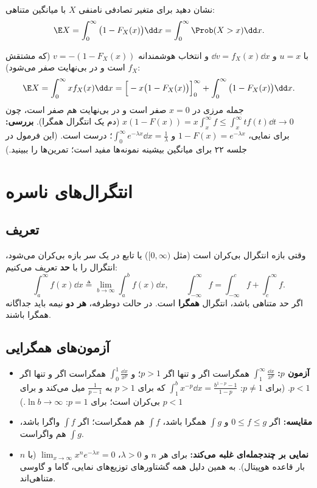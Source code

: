 \begin{example}
نشان دهید برای متغیر تصادفی نامنفی $X$ با میانگین متناهی:
\[
\E X=\int_0^\infty\big(1-F_X(x)\big)\dd x=\int_0^\infty\Prob(X>x)\dd x .
\]
\begin{solution}
با $u=x$ و $\dd v=f_X(x)\dd x$ و انتخاب هوشمندانه $v=-(1-F_X(x))$ (که مشتقش $f_X$ است و در بی‌نهایت صفر می‌شود):
\[
\E X=\int_0^\infty xf_X(x)\dd x=\Big[-x\big(1-F_X(x)\big)\Big]_0^\infty+\int_0^\infty\big(1-F_X(x)\big)\dd x .
\]
جمله مرزی در $x=0$ صفر است و در بی‌نهایت هم صفر است، چون $x(1-F(x))=x\int_x^\infty f\le\int_x^\infty tf(t)\dd t\to0$ (دم یک انتگرال همگرا). \textbf{بررسی:} برای نمایی، $1-F(x)=e^{-\lambda x}$ و $\int_0^\infty e^{-\lambda x}\dd x=\frac1\lambda$؛ درست است. (این فرمول در جلسه ۲۲ برای میانگین بیشینه نمونه‌ها مفید است؛ تمرین‌ها را ببینید.)
\end{solution}
\end{example}

\section{انتگرال‌های ناسره}

\subsection{تعریف}
وقتی بازه انتگرال بی‌کران است (مثل $[0,\infty)$) یا تابع در یک سر بازه بی‌کران می‌شود، انتگرال را با \textbf{حد} تعریف می‌کنیم:
\[
\int_a^\infty f(x)\dd x\triangleq\lim_{b\to\infty}\int_a^bf(x)\dd x,\qquad
\int_{-\infty}^\infty f=\int_{-\infty}^cf+\int_c^\infty f .
\]
اگر حد متناهی باشد، انتگرال \textbf{همگرا} است. در حالت دوطرفه، \textbf{هر دو} نیمه باید جداگانه همگرا باشند.

\subsection{آزمون‌های همگرایی}
\begin{itemize}
\item \textbf{آزمون $p$:} $\int_1^\infty\frac{\dd x}{x^p}$ همگراست اگر و تنها اگر $p>1$؛ و $\int_0^1\frac{\dd x}{x^p}$ همگراست اگر و تنها اگر $p<1$. (برای $p\neq1$: $\int_1^b x^{-p}\dd x=\frac{b^{1-p}-1}{1-p}$ که برای $p>1$ به $\frac{1}{p-1}$ میل می‌کند و برای $p<1$ بی‌کران است؛ برای $p=1$: $\ln b\to\infty$.)
\item \textbf{مقایسه:} اگر $0\le f\le g$ و $\int g$ همگرا باشد، $\int f$ هم همگراست؛ اگر $\int f$ واگرا باشد، $\int g$ هم واگراست.
\item \textbf{نمایی بر چندجمله‌ای غلبه می‌کند:} برای هر $n$ و $\lambda>0$، $\lim_{x\to\infty}x^ne^{-\lambda x}=0$ (با $n$ بار قاعده هوپیتال). به همین دلیل همه گشتاورهای توزیع‌های نمایی، گاما و گاوسی متناهی‌اند.
\end{itemize}

